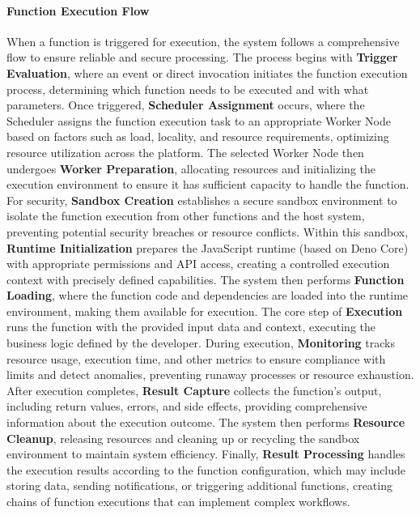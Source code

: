 \documentclass{article}
\begin{document}
\paragraph{Function Execution Flow}
When a function is triggered for execution, the system follows a comprehensive flow to ensure reliable and secure processing. The process begins with \textbf{Trigger Evaluation}, where an event or direct invocation initiates the function execution process, determining which function needs to be executed and with what parameters. Once triggered, \textbf{Scheduler Assignment} occurs, where the Scheduler assigns the function execution task to an appropriate Worker Node based on factors such as load, locality, and resource requirements, optimizing resource utilization across the platform. The selected Worker Node then undergoes \textbf{Worker Preparation}, allocating resources and initializing the execution environment to ensure it has sufficient capacity to handle the function. For security, \textbf{Sandbox Creation} establishes a secure sandbox environment to isolate the function execution from other functions and the host system, preventing potential security breaches or resource conflicts. Within this sandbox, \textbf{Runtime Initialization} prepares the JavaScript runtime (based on Deno Core) with appropriate permissions and API access, creating a controlled execution context with precisely defined capabilities. The system then performs \textbf{Function Loading}, where the function code and dependencies are loaded into the runtime environment, making them available for execution. The core step of \textbf{Execution} runs the function with the provided input data and context, executing the business logic defined by the developer. During execution, \textbf{Monitoring} tracks resource usage, execution time, and other metrics to ensure compliance with limits and detect anomalies, preventing runaway processes or resource exhaustion. After execution completes, \textbf{Result Capture} collects the function's output, including return values, errors, and side effects, providing comprehensive information about the execution outcome. The system then performs \textbf{Resource Cleanup}, releasing resources and cleaning up or recycling the sandbox environment to maintain system efficiency. Finally, \textbf{Result Processing} handles the execution results according to the function configuration, which may include storing data, sending notifications, or triggering additional functions, creating chains of function executions that can implement complex workflows.
\end{document}
